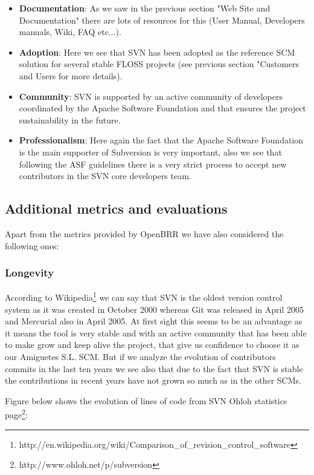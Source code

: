 \documentclass[a4paper,10pt]{article}
\begin{document}
\begin{itemize}
\item \textbf{Documentation}: As we saw in the previous section "Web Site and Documentation" there are lots of resources for this (User Manual, Developers manuals, Wiki, FAQ etc...).
\item \textbf{Adoption}: Here we see that SVN has been adopted as the reference SCM solution for several stable FLOSS projects (see previous section "Customers and Users for more details).
\item \textbf{Community}: SVN is supported by an active community of developers coordinated by the Apache Software Foundation and that ensures the project sustainability in the future.
\item \textbf{Professionalism}: Here again the fact that the Apache Software Foundation is the main supporter of Subversion is very important, also we see that following the ASF guidelines there is a very strict process to accept new contributors in the SVN core developers team.
\end{itemize}

\subsection{Additional metrics and evaluations}

Apart from the metrics provided by OpenBRR we have also considered the following ones:

\subsubsection{Longevity}

According to
Wikipedia\footnote{
http://en.wikipedia.org/wiki/Comparison\_of\_revision\_control\_software} we can
say that SVN is the oldest version control system as it was created in October
2000 whereas Git was released in April 2005 and Mercurial also in April 2005. At
first sight this seems to be an advantage as it means the tool is very stable
and with an active community that has been able to make grow and keep alive the
project, that give us confidence to choose it as our Amiguetes S.L. SCM. But if
we analyze the evolution of contributors commits in the last ten years we see
also that due to the fact that SVN is stable the contributions in recent years
have not grown so much as in the other SCMs.

Figure below shows the evolution of lines of code from SVN Ohloh statistics page\footnote{http://www.ohloh.net/p/subversion}:
\end{document}
